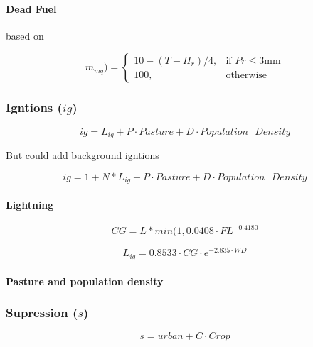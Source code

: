 \paragraph{Dead Fuel}
based on \citep{viney1991review}

\begin{equation}
     m_{mq})=
        \begin{cases}
            10 - (T - H_r) / 4 ,& \text{if } Pr\leq 3 \text{mm}\\
            100,              & \text{otherwise}
        \end{cases}
\end{equation}


\subsubsection{Igntions ($ig$)}

\begin{equation}
    ig = L_{ig} + P \cdot Pasture + D \cdot Population\text{ }Density
\end{equation}

But could add background igntions

\begin{equation}
     ig = 1 + N * L_{ig} + P \cdot Pasture + D \cdot Population\text{ }Density
\end{equation}


\paragraph{Lightning}

\begin{equation}
    CG = L * min(1, 0.0408 \cdot FL^{-0.4180}
\end{equation}

\begin{equation}
    L_{ig} = 0.8533 \cdot CG \cdot e^{-2.835 \cdot WD}
\end{equation}
    

\paragraph{Pasture and population density}


\subsubsection{Supression ($s$)}

\begin{equation}
    s = urban + C \cdot Crop
\end{equation}

